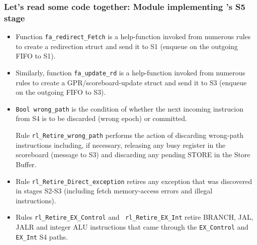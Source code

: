 
\begin{frame}[fragile]
\frametitle{Let's read some code together: Module implementing {\FIFE}'s S5 stage}

\begin{center}\scriptsize

 \vspace*{5ex}
 
 \begin{minipage}{0.9\textwidth}
  \begin{itemize}

    \item Function {\tt fa\_redirect\_Fetch} is a help-function
      invoked from numerous rules to create a redirection struct and
      send it to S1 (enqueue on the outgoing FIFO to S1).

    \item Similarly, function {\tt fa\_update\_rd} is a help-function
      invoked from numerous rules to create a GPR/scoreboard-update
      struct and send it to S3 (enqueue on the outgoing FIFO to S3).

    \item {\tt Bool wrong\_path} is the condition of whether the next
      incoming instrucion from S4 is to be discarded (wrong epoch) or
      committed.

      Rule {\tt rl\_Retire\_wrong\_path} performs the action of
      discarding wrong-path instructions including, if necessary,
      releasing any busy register in the scoreboard (message to S3)
      and discarding any pending STORE in the Store Buffer.

    \item Rule {\tt rl\_Retire\_Direct\_exception} retires any
      exception that was discovered in stages S2-S3 (including fetch
      memory-access errors and illegal instructions).

    \item Rules {\tt rl\_Retire\_EX\_Control} and {\tt
      rl\_Retire\_EX\_Int} retire BRANCH, JAL, JALR and integer ALU
      instructions that came through the {\tt EX\_Control} and {\tt
      EX\_Int} S4 paths.


\end{itemize}
\end{minipage}
\end{center}
\end{frame}
